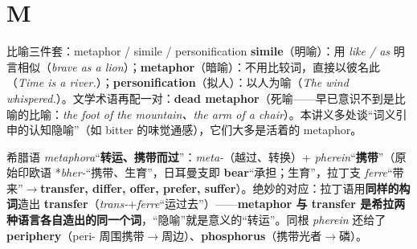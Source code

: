 \documentclass[../main.tex]{subfiles}
\begin{document}
\section{M}



\begin{gram}{比喻三件套：metaphor / simile / personification}
\textbf{simile}（明喻）：用 \textit{like / as} 明言相似（\textit{brave as a lion}）；\textbf{metaphor}（暗喻）：不用比较词，直接以彼名此（\textit{Time is a river.}）；\textbf{personification}（拟人）：以人为喻（\textit{The wind whispered.}）。文学术语再配一对：\textbf{dead metaphor}（死喻——早已意识不到是比喻的比喻：\textit{the foot of the mountain、the arm of a chair}）。本讲义多处谈“词义引申的认知隐喻”（如 bitter 的味觉通感），它们大多是活着的 metaphor。
\end{gram}

\begin{origin}
希腊语 \textit{metaphora}“\textbf{转运、携带而过}”：\textit{meta-}（越过、转换）+ \textit{pherein}“\textbf{携带}”（原始印欧语 *\textit{bher-}“携带、生育”，日耳曼支即 \textbf{bear}“承担；生育”，拉丁支 \textit{ferre}“带来”$\to$\textbf{transfer, differ, offer, prefer, suffer}）。绝妙的对应：拉丁语用\textbf{同样的构词}造出 \textbf{transfer}（\textit{trans-}$+$\textit{ferre}“运过去”）——\textbf{metaphor 与 transfer 是希拉两种语言各自造出的同一个词}，“隐喻”就是意义的“转运”。同根 \textit{pherein} 还给了 \textbf{periphery}（peri- 周围携带$\to$周边）、\textbf{phosphorus}（携带光者$\to$磷）。
\end{origin}


\end{document}
